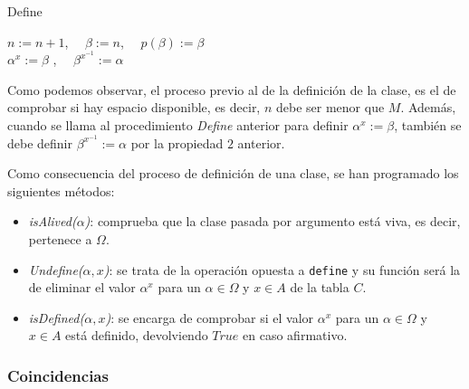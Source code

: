 \begin{center}
\begin{minipage}{.65\linewidth}
    \begin{algorithm}[H] 
    \SetAlgoLined
    	\caption{Define}

            $n := n+1$, $\quad \beta := n$, $\quad p(\beta):=\beta$ \\
    	    $\alpha^x := \beta$ , $\quad \beta^{x^{-1}} := \alpha$ 
    
    \end{algorithm} 
\end{minipage}
\end{center}

\vspace{0.5cm}
Como podemos observar, el proceso previo al de la definición de la clase, es el de comprobar si hay espacio disponible, es decir, $n$ debe ser menor que $M$.
Además, cuando se llama al procedimiento \textit{Define} anterior para definir $\alpha^x:= \beta$, también se debe definir $\beta^{x^{-1}}:=\alpha$ por la propiedad $2$ anterior.


Como consecuencia del proceso de definición de una clase, se han programado los siguientes métodos:
\begin{itemize}
    \item \textit{isAlived($\alpha$)}: comprueba que la clase pasada por argumento está viva, es decir, pertenece a $\Omega$.
    \item \textit{Undefine($\alpha, x$)}: se trata de la operación opuesta a \texttt{define} y su función será la de eliminar el valor $\alpha^x$ para un $\alpha \in \Omega$ y $x \in A$ de la tabla $C$.
    
    \item \textit{isDefined($\alpha, x$)}: se encarga de comprobar si el valor $\alpha^x$ para un $\alpha \in \Omega$ y $x \in A$ está definido, devolviendo $True$ en caso afirmativo.
\end{itemize}







\subsubsection{Coincidencias} \label{siguiente}

